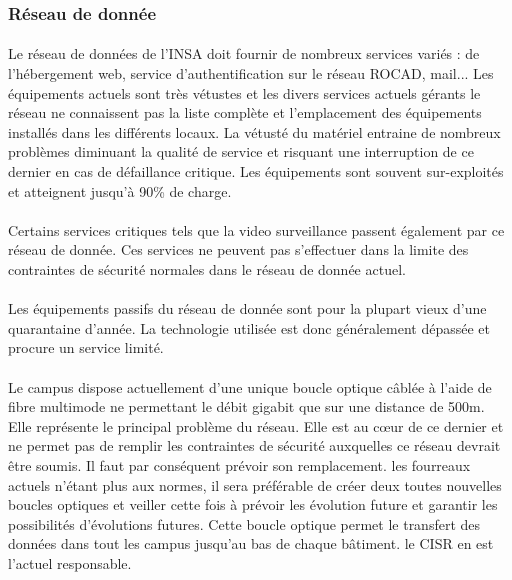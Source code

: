 \subsubsection{Réseau de donnée}

\paragraph{} Le réseau de données de l'INSA doit fournir de nombreux services variés : de l'hébergement web, service d'authentification sur le réseau ROCAD, mail... Les équipements actuels sont très vétustes et les divers services actuels gérants le réseau ne connaissent pas la liste complète et l'emplacement des équipements installés dans les différents locaux. La vétusté du matériel entraine de nombreux problèmes diminuant la qualité de service et risquant une interruption de ce dernier en cas de défaillance critique. Les équipements sont souvent sur-exploités et atteignent jusqu'à 90\% de charge.

\paragraph{} Certains services critiques tels que la video surveillance passent également par ce réseau de donnée. Ces services ne peuvent pas s'effectuer dans la limite des contraintes de sécurité normales dans le réseau de donnée actuel.

\paragraph{} Les équipements passifs du réseau de donnée sont pour la plupart vieux d'une quarantaine d'année. La technologie utilisée est donc généralement dépassée et procure un service limité.

\paragraph{} Le campus dispose actuellement d'une unique boucle optique câblée à l'aide de fibre multimode ne permettant le débit gigabit que sur une distance de 500m. Elle représente le principal problème du réseau. Elle est au cœur de ce dernier et ne permet pas de remplir les contraintes de sécurité auxquelles ce réseau devrait être soumis. Il faut par conséquent prévoir son remplacement. les fourreaux actuels n'étant plus aux normes, il sera préférable de créer deux toutes nouvelles boucles optiques et veiller cette fois à prévoir les évolution future et garantir les possibilités d'évolutions futures. Cette boucle optique permet le transfert des données dans tout les campus jusqu'au bas de chaque bâtiment. le CISR en est l'actuel responsable.

